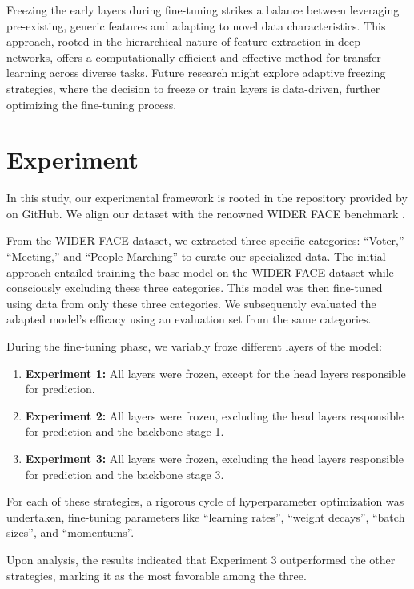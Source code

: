 \documentclass{article}
\begin{document}
Freezing the early layers during fine-tuning strikes a balance between leveraging pre-existing, generic features and adapting to novel data characteristics. This approach, rooted in the hierarchical nature of feature extraction in deep networks, offers a computationally efficient and effective method for transfer learning across diverse tasks. Future research might explore adaptive freezing strategies, where the decision to freeze or train layers is data-driven, further optimizing the fine-tuning process.
  
\section{Experiment}

In this study, our experimental framework is rooted in the repository provided by \cite{biubug6_2020} on GitHub. We align our dataset with the renowned WIDER FACE benchmark \cite{yang2016wider}.

From the WIDER FACE dataset, we extracted three specific categories: ``Voter,'' ``Meeting,'' and ``People Marching'' to curate our specialized data. The initial approach entailed training the base model on the WIDER FACE dataset while consciously excluding these three categories. This model was then fine-tuned using data from only these three categories. We subsequently evaluated the adapted model's efficacy using an evaluation set from the same categories.

During the fine-tuning phase, we variably froze different layers of the model:

\begin{enumerate}
    \item \textbf{Experiment 1:} All layers were frozen, except for the head layers responsible for prediction.
    \item \textbf{Experiment 2:} All layers were frozen, excluding the head layers responsible for prediction and the backbone stage 1.
    \item \textbf{Experiment 3:} All layers were frozen, excluding the head layers responsible for prediction and the backbone stage 3.
\end{enumerate}

For each of these strategies, a rigorous cycle of hyperparameter optimization was undertaken, fine-tuning parameters like ``learning rates'', ``weight decays'', ``batch sizes'', and ``momentums''.

Upon analysis, the results indicated that Experiment 3 outperformed the other strategies, marking it as the most favorable among the three.
\end{document}

